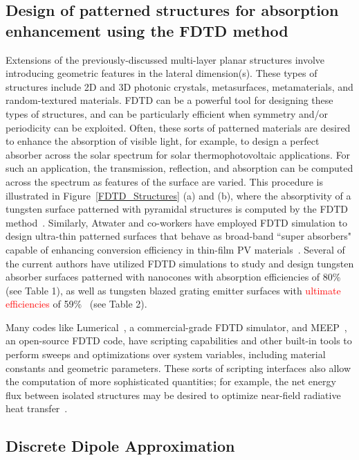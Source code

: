 \documentclass[review]{elsarticle}
\begin{document}
\subsection{Design of patterned structures for absorption enhancement using the FDTD method}
Extensions of the previously-discussed multi-layer planar structures involve introducing geometric features in the
lateral dimension(s).  These types of structures include 2D and 3D photonic crystals, metasurfaces, metamaterials, and random-textured materials.
FDTD can be a powerful tool for designing these types of structures, and can be particularly efficient when symmetry and/or periodicity can be
exploited.  Often, these sorts of patterned materials are desired to enhance the absorption of visible light, for example, to design a perfect
absorber across the solar spectrum for solar thermophotovoltaic applications.  For such an application, the transmission, reflection, and
absorption can be computed across the spectrum as features of the surface are varied.  This procedure is illustrated in Figure~\ref{FDTD_Structures} (a) and (b), where the absorptivity of a tungsten surface patterned with pyramidal structures is computed by the FDTD method~\cite{paper1_ref4}. Similarly, Atwater and co-workers
have employed FDTD simulation to design ultra-thin patterned surfaces that behave as broad-band
``super absorbers" capable of enhancing conversion efficiency in
thin-film PV materials~\cite{AFB_NatComm_2011}.  Several of the current authors have utilized FDTD simulations to 
study and
design tungsten absorber surfaces patterned with nanocones 
with absorption efficiencies of 80\%~\cite{me1} (see Table 1),
as well as tungsten blazed grating emitter surfaces with \textcolor{red}{ultimate efficiencies} of 59\%~\cite{me2} (see Table 2).

Many codes like Lumerical~\cite{lumerical}, a commercial-grade
FDTD simulator, and MEEP~\cite{Meep}, an open-source FDTD code, have scripting
capabilities and other built-in tools to perform sweeps and optimizations over system variables, including material constants and geometric
parameters.  
These sorts of scripting interfaces also allow the computation of more sophisticated quantities; for example, the net energy flux between isolated
structures may be desired to optimize near-field radiative heat transfer~\cite{datas2013}.

\subsection{Discrete Dipole Approximation}
\end{document}

